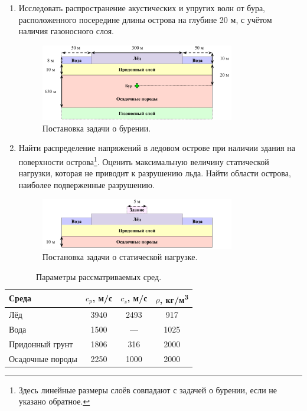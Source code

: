 \begin{enumerate}
    \item Исследовать распространение акустических и упругих волн от бура, расположенного посередине длины острова на глубине 20 м, с учётом наличия газоносного слоя.
    
    \begin{figure}[htb]
        \centering
        \includegraphics[width=0.8\textwidth]{images/gas_field/gas_field_scheme.png}
        \caption{Постановка задачи о бурении.}
        \label{fig:island}
    \end{figure}

    \item Найти распределение напряжений в ледовом острове при наличии здания на поверхности острова\footnote{Здесь линейные размеры слоёв совпадают с задачей о бурении, если не указано обратное.}. Оценить максимальную величину статической нагрузки, которая не приводит к разрушению льда. Найти области острова, наиболее подверженные разрушению.
    
    \begin{figure}[htb]
        \centering
        \includegraphics[width=0.8\textwidth]{images/stamp/stamp_scheme.png}
        \caption{Постановка задачи о статической нагрузке.}
        \label{fig:stamp_scheme}
    \end{figure}
\end{enumerate}

\renewcommand{\arraystretch}{1.2}
\begin{table}[htb]
\centering
    \begin{tabular}{|l|c|c|c|}
    \hline
    Среда & $c_p$, м/с & $c_s$, м/с & $\rho$, кг/м\textsuperscript{3} \\ \hline
    Лёд & 3940 & 2493 & 917 \\ \hline
    Вода & 1500  & --- & 1025 \\ \hline
    Придонный грунт & 1806 & 316 & 2000 \\ \hline
    Осадочные породы & 2250 & 1000 & 2000 \\ \hline
    \end{tabular}
\caption{Параметры рассматриваемых сред.}
\label{tab:geo}
\end{table}
\renewcommand{\arraystretch}{1.0}

